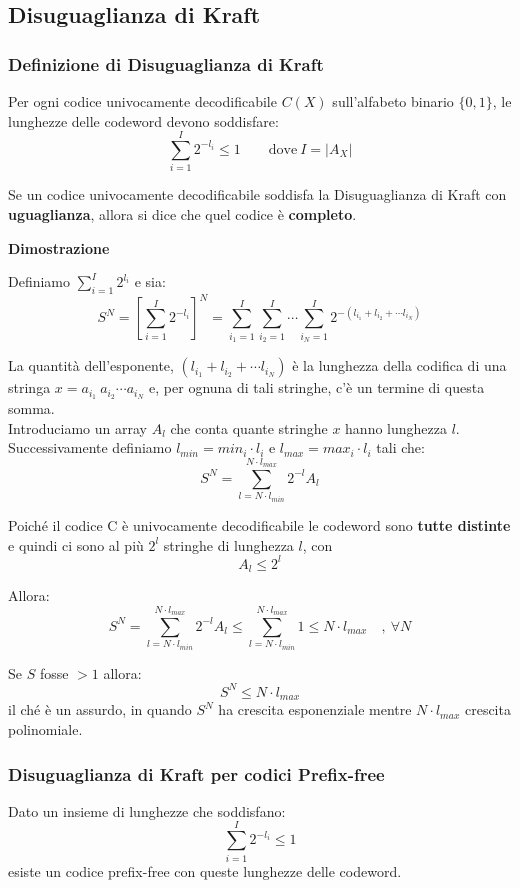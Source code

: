 \subsection{Disuguaglianza di Kraft}
\subsubsection{Definizione di Disuguaglianza di Kraft}
Per ogni codice univocamente decodificabile $C(X)$ sull'alfabeto binario $\{0,1\}$, le lunghezze delle codeword devono soddisfare:
\begin{equation}
	\sum_{i=1}^{I} 2^{-l_i} \leq 1 \qquad \text{dove}\ I = |A_X| 
\end{equation}

Se un codice univocamente decodificabile soddisfa la Disuguaglianza di Kraft con \textbf{uguaglianza}, allora si dice che quel codice è \textbf{completo}.

\textbf{Dimostrazione}

Definiamo $\sum_{i=1}^{I} 2^{l_i}$ e sia:
$$
S^N = \left[\sum_{i=1}^{I} 2^{-l_i}\right]^N = \sum_{i_1 = 1}^{I} \sum_{i_2 = 1}^{I} \cdots \sum_{i_N = 1}^{I} 2^{-(l_{i_1} + l_{i_2} + \cdots l_{i_N})}
$$

La quantità dell'esponente, $(l_{i_1} + l_{i_2} + \cdots l_{i_N})$ è la lunghezza della codifica di una stringa $x = a_{i_1}\ a_{i_2}\cdots a_{i_N}$ e, per ognuna di tali stringhe, c'è un termine di questa somma.\\
Introduciamo un array $A_l$ che conta quante stringhe $x$ hanno lunghezza $l$.\\ Successivamente definiamo $l_{min} = min_i\cdot l_i$ e $l_{max} = max_i \cdot l_i$ tali che:
$$
S^N = \sum_{l=N\cdot l_{min}}^{N\cdot l_{max}} 2^{-l} A_l
$$

Poiché il codice C è univocamente decodificabile le codeword sono \textbf{tutte distinte} e quindi ci sono al più $2^l$ stringhe di lunghezza $l$, con $$A_l \leq 2^l$$

Allora:
$$
S^N = \sum_{l=N\cdot l_{min}}^{N\cdot l_{max}} 2^{-l} A_l \leq \sum_{l=N\cdot l_{min}}^{N\cdot l_{max}} 1 \leq N \cdot l_{max} \quad ,\ \forall N
$$

Se $S$ fosse $>1$ allora: $$S^N \leq N \cdot l_{max}$$
il ché è un assurdo, in quando $S^N$ ha crescita esponenziale mentre $N \cdot l_{max}$ crescita polinomiale.

\subsubsection{Disuguaglianza di Kraft per codici Prefix-free}
Dato un insieme di lunghezze che soddisfano:
$$
\sum_{i=1}^{I} 2^{-l_i} \leq 1
$$
esiste un codice prefix-free con queste lunghezze delle codeword.

